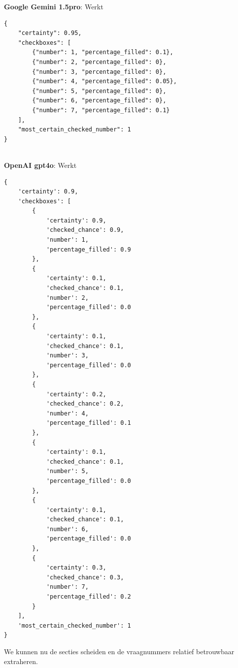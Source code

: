 \documentclass[12pt]{article}
\begin{document}
\textbf{Google Gemini 1.5pro}: Werkt
\begin{listing}[H]
    
    \begin{verbatim}
{
    "certainty": 0.95, 
    "checkboxes": [
        {"number": 1, "percentage_filled": 0.1}, 
        {"number": 2, "percentage_filled": 0}, 
        {"number": 3, "percentage_filled": 0}, 
        {"number": 4, "percentage_filled": 0.05}, 
        {"number": 5, "percentage_filled": 0}, 
        {"number": 6, "percentage_filled": 0}, 
        {"number": 7, "percentage_filled": 0.1}
    ], 
    "most_certain_checked_number": 1
}
        \end{verbatim}
\end{listing}
\\
\textbf{OpenAI gpt4o}: Werkt
\begin{listing}[H]
    
    \begin{verbatim}
{
    'certainty': 0.9, 
    'checkboxes': [
        {
            'certainty': 0.9, 
            'checked_chance': 0.9, 
            'number': 1, 
            'percentage_filled': 0.9
        }, 
        {
            'certainty': 0.1, 
            'checked_chance': 0.1, 
            'number': 2, 
            'percentage_filled': 0.0
        }, 
        {
            'certainty': 0.1, 
            'checked_chance': 0.1, 
            'number': 3, 
            'percentage_filled': 0.0
        }, 
        {
            'certainty': 0.2, 
            'checked_chance': 0.2, 
            'number': 4, 
            'percentage_filled': 0.1
        }, 
        {
            'certainty': 0.1, 
            'checked_chance': 0.1, 
            'number': 5, 
            'percentage_filled': 0.0
        }, 
        {
            'certainty': 0.1, 
            'checked_chance': 0.1, 
            'number': 6, 
            'percentage_filled': 0.0
        },
        {
            'certainty': 0.3, 
            'checked_chance': 0.3, 
            'number': 7, 
            'percentage_filled': 0.2
        }
    ], 
    'most_certain_checked_number': 1
}
\end{verbatim}
\end{listing}
\begin{multicols}{2}
We kunnen nu de secties scheiden en de vraagnummers relatief betrouwbaar extraheren.
\end{multicols}
\end{document}
